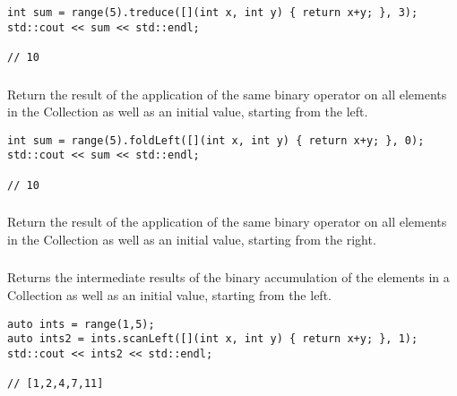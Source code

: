 \begin{lstlisting}[title=example]
int sum = range(5).treduce([](int x, int y) { return x+y; }, 3);
std::cout << sum << std::endl;

// 10
\end{lstlisting}




\subsubsection{}

Return the result of the application of the same binary operator on all elements in the Collection as well as an initial value, starting from the left.

\begin{lstlisting}[title=example]
int sum = range(5).foldLeft([](int x, int y) { return x+y; }, 0);
std::cout << sum << std::endl;

// 10
\end{lstlisting}




\subsubsection{}

Return the result of the application of the same binary operator on all elements in the Collection as well as an initial value, starting from the right.




\subsubsection{}

Returns the intermediate results of the binary accumulation of the elements in a Collection as well as an initial value, starting from the left.

\begin{lstlisting}[title=example]
auto ints = range(1,5);
auto ints2 = ints.scanLeft([](int x, int y) { return x+y; }, 1);
std::cout << ints2 << std::endl;

// [1,2,4,7,11]
\end{lstlisting}




\subsubsection{}

